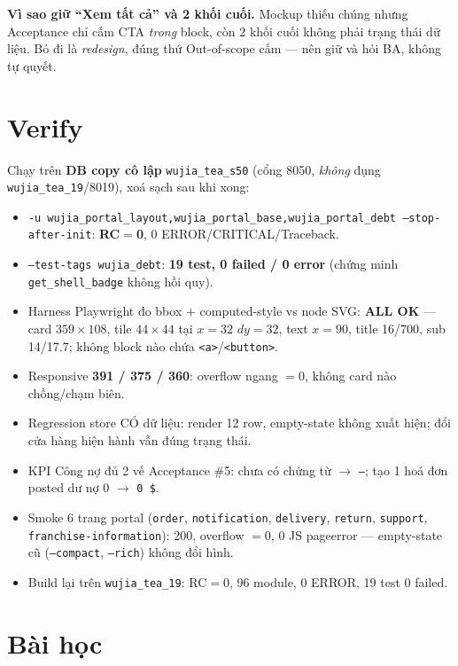 \textbf{Vì sao giữ ``Xem tất cả'' và 2 khối cuối.} Mockup thiếu chúng nhưng Acceptance chỉ cấm
CTA \emph{trong} block, còn 2 khối cuối không phải trạng thái dữ liệu. Bỏ đi là \emph{redesign},
đúng thứ Out-of-scope cấm --- nên giữ và hỏi BA, không tự quyết.

\section{Verify}

Chạy trên \textbf{DB copy cô lập} \texttt{wujia\_tea\_s50} (cổng 8050, \emph{không} đụng
\texttt{wujia\_tea\_19}/8019), xoá sạch sau khi xong:

\begin{itemize}
  \item \texttt{-u wujia\_portal\_layout,wujia\_portal\_base,wujia\_portal\_debt
    --stop-after-init}: \textbf{RC$=$0}, 0 ERROR/CRITICAL/Traceback.
  \item \texttt{--test-tags wujia\_debt}: \textbf{19 test, 0 failed / 0 error} (chứng minh
    \texttt{get\_shell\_badge} không hồi quy).
  \item Harness Playwright đo bbox $+$ computed-style vs node SVG: \textbf{ALL OK} --- card
    $359\times108$, tile $44\times44$ tại $x=32$ $dy=32$, text $x=90$, title 16/700, sub
    14/17.7; không block nào chứa \texttt{<a>}/\texttt{<button>}.
  \item Responsive \textbf{391 / 375 / 360}: overflow ngang $=0$, không card nào chồng/chạm biên.
  \item Regression store CÓ dữ liệu: render 12 row, empty-state không xuất hiện; đổi cửa hàng
    hiện hành vẫn đúng trạng thái.
  \item KPI Công nợ đủ 2 vế Acceptance \#5: chưa có chứng từ $\rightarrow$ \texttt{---}; tạo 1
    hoá đơn posted dư nợ $0$ $\rightarrow$ \texttt{0 \$}.
  \item Smoke 6 trang portal (\texttt{order}, \texttt{notification}, \texttt{delivery},
    \texttt{return}, \texttt{support}, \texttt{franchise-information}): 200, overflow $=0$,
    0 JS pageerror --- empty-state cũ (\texttt{--compact}, \texttt{--rich}) không đổi hình.
  \item Build lại trên \texttt{wujia\_tea\_19}: RC$=$0, 96 module, 0 ERROR, 19 test 0 failed.
\end{itemize}

\section{Bài học}

